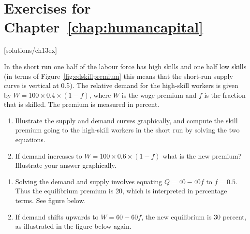 \newpage
\section*{Exercises for Chapter~\ref{chap:humancapital}}

\begin{enumialphparenastyle}

[solutions/ch13ex]

\begin{ex}\label{ex:ch13ex1}
In the short run one half of the labour force has high skills and one half low skills (in terms of Figure~\ref{fig:edskillpremium} this means that the short-run supply curve is vertical at 0.5). The relative demand for the high-skill workers is given by $W=100\times 0.4\times (1-f)$, where $W$ is the wage premium and $f$ is the fraction that is skilled. The premium is measured in percent.
\begin{enumerate}
	\item	Illustrate the supply and demand curves graphically, and compute the skill premium going to the high-skill workers in the short run by solving the two equations.
	\item	If demand increases to $W=100\times 0.6\times (1-f)$ what is the new premium? Illustrate your answer graphically.
\end{enumerate}
\begin{sol}
\begin{enumerate}
	\item	Solving the demand and supply involves equating $Q=40-40f$ to $f=0.5$. Thus the equilibrium premium is 20, which is interpreted in percentage terms. See figure below.
	\item	If demand shifts upwards to $W=60-60f$, the new equilibrium is 30 percent, as illustrated in the figure below again.
\end{enumerate}
\end{sol}
\end{ex}


\end{enumialphparenastyle}

